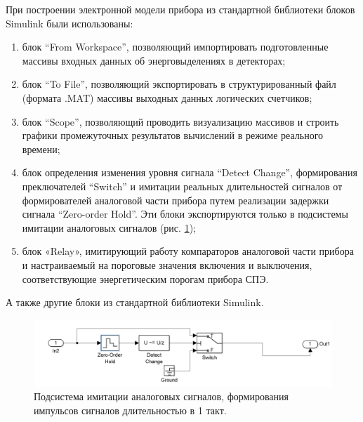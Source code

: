 При построении электронной модели прибора из стандартной библиотеки блоков Simulink были использованы:\begin{enumerate}
	\item блок “From Workspace”, позволяющий импортировать подготовленные массивы входных данных об энерговыделениях в детекторах;
	\item блок “To File”, позволяющий экспортировать в структурированный файл (формата .MAT) массивы выходных данных логических счетчиков;
	\item блок “Scope”, позволяющий проводить визуализацию массивов и строить графики промежуточных результатов вычислений в режиме реального времени;
	\item блок определения изменения уровня сигнала “Detect Change”, формирования преключателей “Switch” и имитации реальных длительностей сигналов от формирователей аналоговой части прибора путем реализации задержки сигнала “Zero-order Hold”. Эти блоки  экспортируются только в подсистемы имитации аналоговых сигналов (рис. \ref{fig:simulink_analog});
	\item блок «Relay», имитирующий работу компараторов аналоговой части прибора и настраиваемый на пороговые значения включения и выключения, соответствующие энергетическим порогам прибора СПЭ.
\end{enumerate}
А также другие блоки из стандартной библиотеки Simulink.

\begin{figure}
\centering
\includegraphics[width=0.7\linewidth]{images/simulink_analog}
\caption{Подсистема имитации аналоговых сигналов, формирования импульсов сигналов длительностью в 1 такт.}
\label{fig:simulink_analog}
\end{figure}


